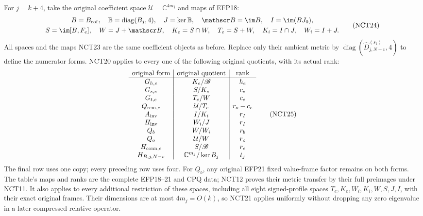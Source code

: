 \documentclass[11pt,a4paper]{article}
\begin{document}
For \(j=k+4\), take the original coefficient space
\(\mathcal U=\mathbb C^{4m_j}\) and maps of EFP18:
\[
\begin{gathered}
 B=B_{\rm cof},\quad\mathbb B=\operatorname{diag}(B_j,4),\quad
 J=\ker\mathbb B,\quad\mathscr B=\im B,\quad I=\im(BJ_0),\\
 S=\im[B,F_e],\quad W=J+\mathscr B,\quad
 K_e=S\cap W,\quad T_e=S+W,\quad
 K_i=I\cap J,\quad W_i=I+J.
\end{gathered}\tag{NCT24}
\]
All spaces and the maps NCT23 are the same coefficient objects
as before.  Replace only their ambient metric by
\(\operatorname{diag}(\widehat D_{j,N-v}^{(s_1)},4)\) to define
the numerator forms.  NCT20 applies to every one of the following
original quotients, with its actual rank:
\[
\begin{array}{c|c|c}
 \text{original form}&\text{original quotient}&\text{rank}\\\hline
 G_{h,e}&K_e/\mathscr B&h_e\\
 G_{s,e}&S/K_e&c_e\\
 G_{t,e}&T_e/W&c_e\\
 Q_{{\rm rem},e}&\mathcal U/T_e&r_o-c_e\\
 A_{\rm inv}&I/K_i&r_I\\
 H_{\rm inv}&W_i/J&r_I\\
 Q_b&W/W_i&r_b\\
 Q_o&\mathcal U/W&r_o\\
 H_{{\rm conn},e}&S/\mathscr B&r_e\\
 H_{B,j,N-v}&\mathbb C^{m_j}/\ker B_j&t_j
\end{array}\tag{NCT25}
\]
The final row uses one copy; every preceding row uses four.
For \(Q_b\), any original EFP21 fixed value-frame factor remains
on both forms.  The table's maps and ranks are the complete EFP18--21
and CPQ data; NCT12 proves their metric transfer by their full
preimages under NCT11.  It also applies to every additional
restriction of these spaces, including all eight signed-profile
spaces \(T_e,K_e,W_i,K_i,W,S,J,I\), with their exact original
frames.  Their dimensions are at most \(4m_j=O(k)\), so NCT21
applies uniformly without dropping any zero eigenvalue in a
later compressed relative operator.
\end{document}
